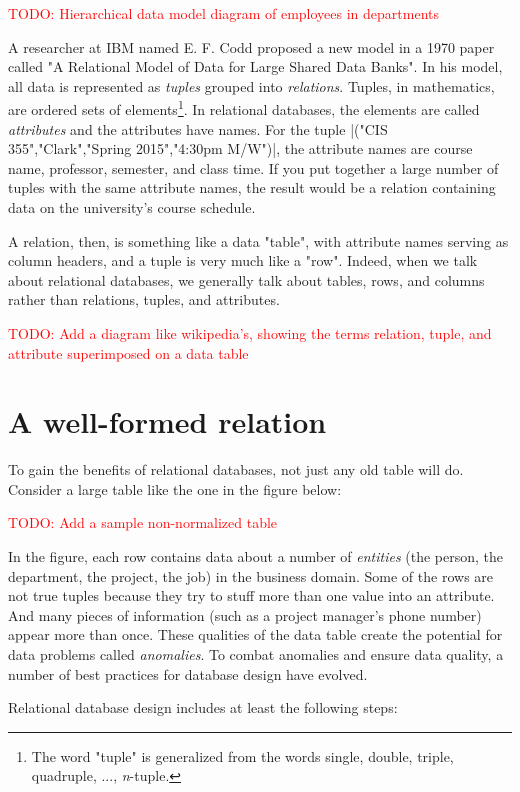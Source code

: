 \documentclass[11pt]{book}
\newcommand{\term}[1]{\emph{#1}} %
\newcommand{\todo}[1]{\textcolor{red}{TODO: #1}} %
\begin{document}
\todo{Hierarchical data model diagram of employees in departments}

A researcher at IBM named E. F. Codd proposed a new model in a 1970 paper called "A Relational Model of Data for Large Shared Data Banks".  In his model, all data is represented as \term{tuples} grouped into \term{relations}.  Tuples, in mathematics, are ordered sets of elements\footnote{The word "tuple" is generalized from the words single, double, triple, quadruple, ..., \emph{n}-tuple.}.  In relational databases, the elements are called \term{attributes} and the attributes have names.  For the tuple |("CIS 355","Clark","Spring 2015","4:30pm M/W")|, the attribute names are course name, professor, semester, and class time.  If you put together a large number of tuples with the same attribute names, the result would be a relation containing data on the university's course schedule.  

A relation, then, is something like a data "table", with attribute names serving as column headers, and a tuple is very much like a "row".  Indeed, when we talk about relational databases, we generally talk about tables, rows, and columns rather than relations, tuples, and attributes.

\todo{Add a diagram like wikipedia's, showing the terms relation, tuple, and attribute superimposed on a data table}


\section{A well-formed relation}

To gain the benefits of relational databases, not just any old table will do.  Consider a large table like the one in the figure below:

\todo{Add a sample non-normalized table}

In the figure, each row contains data about a number of \term{entities} (the person, the department, the project, the job) in the business domain.  Some of the rows are not true tuples because they try to stuff more than one value into an attribute.  And many pieces of information (such as a project manager's phone number) appear more than once.  These qualities of the data table create the potential for data problems called \term{anomalies}.  To combat anomalies and ensure data quality, a number of best practices for database design have evolved.

Relational database design includes at least the following steps:
\end{document}
